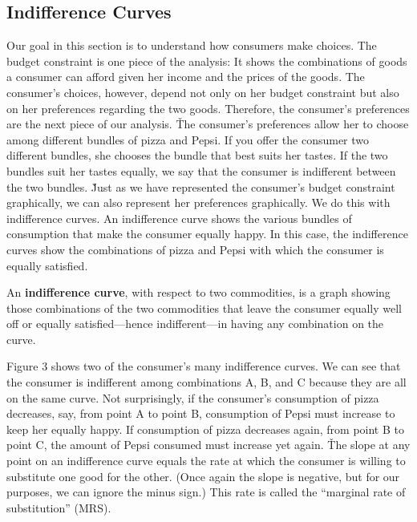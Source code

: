 
\subsection{Indifference Curves}

Our goal in this section is to understand how consumers make choices. The budget constraint is one piece of the
analysis: It shows the combinations of goods a consumer can afford given her income and the prices of the goods. The
consumer's choices, however, depend not only on her budget constraint but also on her preferences regarding the two
goods. Therefore, the consumer's preferences are the next piece of our analysis. \v

The consumer's preferences allow her to choose among different bundles of pizza and Pepsi. If you offer the consumer
two different bundles, she chooses the bundle that best suits her tastes. If the two bundles suit her tastes equally,
we say that the consumer is indifferent between the two bundles. \v

Just as we have represented the consumer's budget constraint graphically, we can also represent her preferences
graphically. We do this with indifference curves. An indifference curve shows the various bundles of consumption that
make the consumer equally happy. In this case, the indifference curves show the combinations of pizza and Pepsi with
which the consumer is equally satisfied.

An \textbf{indifference curve}, with respect to two commodities, is a graph showing those combinations of the two
commodities that leave the consumer equally well off or equally satisfied—hence indifferent—in having any combination
on the curve.
\ed

Figure 3 shows two of the consumer's many indifference curves. We can see that the consumer is indifferent among
combinations A, B, and C because they are all on the same curve. Not surprisingly, if the consumer's consumption of
pizza decreases, say, from point A to point B, consumption of Pepsi must increase to keep her equally happy. If
consumption of pizza decreases again, from point B to point C, the amount of Pepsi consumed must increase yet again. \v

The slope at any point on an indifference curve equals the rate at which the consumer is willing to substitute one
good for the other. (Once again the slope is negative, but for our purposes, we can ignore the minus sign.) This rate
is called the ``marginal rate of substitution'' (MRS).

